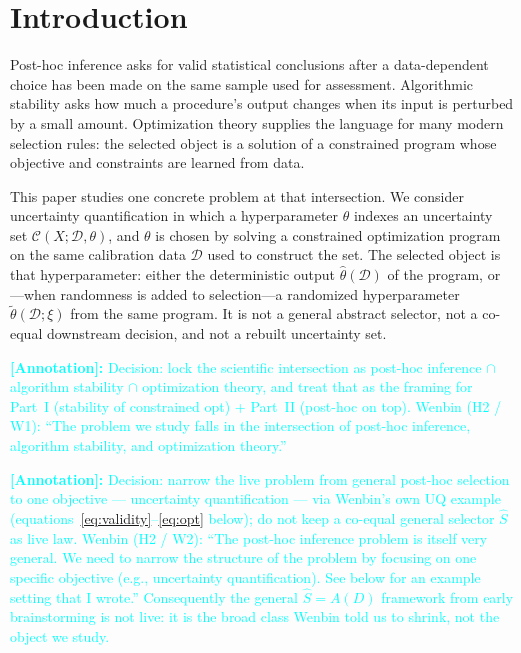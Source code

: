 \documentclass[12pt]{article}
\theoremstyle{plain}
\newcommand{\annote}[1]{\textcolor{cyan}{\textbf{[Annotation]:} #1}}
\begin{document}
\section{Introduction}
\label{sec:intro}

Post-hoc inference asks for valid statistical conclusions after a data-dependent choice has been made on the same sample used for assessment.
Algorithmic stability asks how much a procedure's output changes when its input is perturbed by a small amount.
Optimization theory supplies the language for many modern selection rules: the selected object is a solution of a constrained program whose objective and constraints are learned from data.

This paper studies one concrete problem at that intersection.
We consider uncertainty quantification in which a hyperparameter $\theta$ indexes an uncertainty set $\mathcal{C}(X;\mathcal{D},\theta)$, and $\theta$ is chosen by solving a constrained optimization program on the same calibration data $\mathcal{D}$ used to construct the set.
The selected object is that hyperparameter: either the deterministic output $\hat\theta(\mathcal{D})$ of the program, or---when randomness is added to selection---a randomized hyperparameter $\widetilde\theta(\mathcal{D};\xi)$ from the same program.
It is not a general abstract selector, not a co-equal downstream decision, and not a rebuilt uncertainty set.

\annote{Decision: lock the scientific intersection as post-hoc inference $\cap$ algorithm stability $\cap$ optimization theory, and treat that as the framing for Part~I (stability of constrained opt) + Part~II (post-hoc on top).
Wenbin (H2 / W1): ``The problem we study falls in the intersection of post-hoc inference, algorithm stability, and optimization theory.''}

\annote{Decision: narrow the live problem from general post-hoc selection to one objective --- uncertainty quantification --- via Wenbin's own UQ example (equations~\eqref{eq:validity}--\eqref{eq:opt} below); do not keep a co-equal general selector $\widehat S$ as live law.
Wenbin (H2 / W2): ``The post-hoc inference problem is itself very general. We need to narrow the structure of the problem by focusing on one specific objective (e.g., uncertainty quantification). See below for an example setting that I wrote.''
Consequently the general $\widehat S=A(D)$ framework from early brainstorming is not live: it is the broad class Wenbin told us to shrink, not the object we study.}
\end{document}

